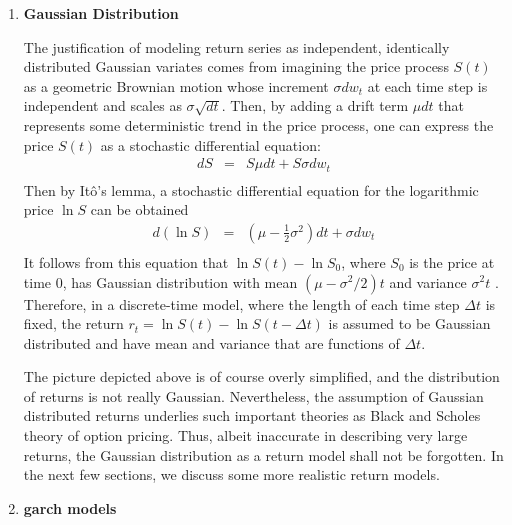 \begin{enumerate}
\item{\bf Gaussian Distribution}

The justification of modeling return series as independent,
identically distributed Gaussian variates comes from imagining the
price process $S(t)$ as a geometric Brownian motion whose increment
$\sigma dw_t$ at each time step is independent and scales as $\sigma
\sqrt{dt}$. Then, by adding a drift term $\mu dt$ that represents some
deterministic trend in the price process, one can express the
price $S(t)$ as a stochastic differential equation:
\begin{eqnarray*}
  dS &=& S\mu dt + S\sigma dw_t \\
\end{eqnarray*}
Then by It\^o's lemma, a stochastic differential equation for the
logarithmic price $\ln S$ can be obtained
\begin{eqnarray*}
  d(\ln S) &=& (\mu - \frac{1}{2} \sigma^2)dt + \sigma dw_t \\
\end{eqnarray*}
It follows from this equation that $\ln S(t) - \ln S_0$, where $S_0$
is the price at time 0, has Gaussian distribution with mean $(\mu -
\sigma^2/2)t$ and variance $\sigma^2 t$ \cite{Bernt2000}. Therefore,
in a discrete-time model, where the length of each time step $\Delta
t$ is fixed, the return $r_t = \ln S(t) - \ln S(t - \Delta t)$ is
assumed to be Gaussian distributed and have mean and variance that are
functions of $\Delta t$.

The picture depicted above is of course overly simplified, and the
distribution of returns is not really Gaussian. Nevertheless, the
assumption of Gaussian distributed returns underlies such important
theories as Black and Scholes theory of option pricing. Thus, albeit
inaccurate in describing very large returns, the Gaussian distribution
as a return model shall not be forgotten. In the next few sections,
we discuss some more realistic return models.

\item{\bf \gls{garch} models}


\end{enumerate}
